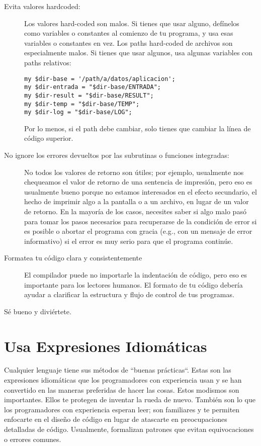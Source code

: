 \begin{description}
\item[Evita valores hardcoded:] Los valores hard-coded 
son malos. Si tienes que usar alguno, defínelos como 
variables o constantes al comienzo de tu programa, y usa esas
variables o constantes en vez. Los paths hard-coded de archivos
son especialmente malos. Si tienes que usar algunos, usa
algunas variables con paths relativos:
\begin{verbatim}
my $dir-base = '/path/a/datos/aplicacion';
my $dir-entrada = "$dir-base/ENTRADA";
my $dir-result = "$dir-base/RESULT";
my $dir-temp = "$dir-base/TEMP";
my $dir-log = "$dir-base/LOG";
\end{verbatim}
Por lo menos, si el path debe cambiar, solo tienes que cambiar
la línea de código superior.

\item[No ignore los errores devueltos por las subrutinas 
o funciones integradas:] No todos los valores de retorno son
útiles; por ejemplo, usualmente nos chequeamos el valor de retorno
de una sentencia de impresión, pero eso es usualmente bueno porque
no estamos interesados en el efecto secundario, el hecho de imprimir
algo a la pantalla o a un archivo, en lugar de un valor de retorno.
En la mayoría de los casos, necesites saber si algo malo pasó 
para tomar los pasos necesarios para recuperarse de la 
condición de error si es posible o abortar el programa con gracia
(e.g., con un mensaje de error informativo) si el error 
es muy serio para que el programa continúe.

\item[Formatea tu código clara y consistentemente] 
El compilador puede no importarle la indentación de código,
pero eso es importante para los lectores humanos. El formato 
de tu código debería ayudar a clarificar la estructura y 
flujo de control de tus programas.

\item[Sé bueno y diviértete.]

\end{description}

\section{Usa Expresiones Idiomáticas}

Cualquier lenguaje tiene sus métodos de ``buenas prácticas``.
Estas son las expresiones idiomáticas que los programadores con
experiencia usan y se han convertido en las maneras preferidas 
de hacer las cosas. Estos modismos son importantes. Ellos
te protegen de inventar la rueda de nuevo. También son lo que
los programadores con experiencia esperan leer; son familiares
y te permiten enfocarte en el diseño de código en lugar de 
atascarte en preocupaciones detalladas de código. Usualmente,
formalizan patrones que evitan equivocaciones o errores comunes.

